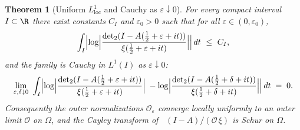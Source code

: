 \documentclass[11pt]{article}
\newtheorem{theorem}{Theorem}
\theoremstyle{remark}
\DeclareMathOperator{\dettwo}{det_2}
\begin{document}
\begin{theorem}[Uniform $L^1_{\mathrm{loc}}$ and Cauchy as $\varepsilon\downarrow 0$]\label{thm:uniform-eps}
For every compact interval $I\subset\R$ there exist constants $C_I$ and $\varepsilon_0>0$ such that for all $\varepsilon\in(0,\varepsilon_0)$,
\[
 \int_I \Bigl|\log\Bigl|\frac{\dettwo(I-A(\tfrac12+\varepsilon+it))}{\xi(\tfrac12+\varepsilon+it)}\Bigr|\Bigr|\,dt\ \le\ C_I,
\]
and the family is Cauchy in $L^1(I)$ as $\varepsilon\downarrow 0$:
\[
 \lim_{\substack{\varepsilon,\delta\downarrow 0}}\ \int_I \Bigl|\log\Bigl|\frac{\dettwo(I-A(\tfrac12+\varepsilon+it))}{\xi(\tfrac12+\varepsilon+it)}\Bigr|\;-
 \log\Bigl|\frac{\dettwo(I-A(\tfrac12+\delta+it))}{\xi(\tfrac12+\delta+it)}\Bigr|\Bigr|\,dt\;=\;0.
\]
Consequently the outer normalizations $\mathcal O_{\varepsilon}$ converge locally uniformly to an outer limit $\mathcal O$ on $\Omega$, and the Cayley transform of $\dettwo(I-A)/(\mathcal O\,\xi)$ is Schur on $\Omega$.
\end{theorem}
\end{document}
